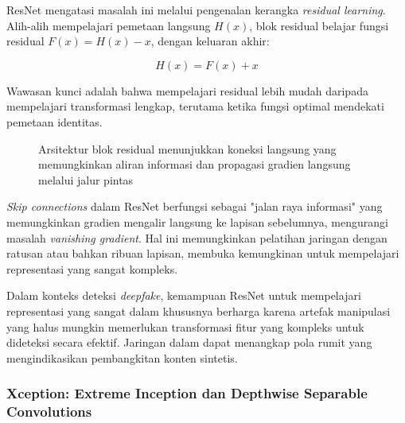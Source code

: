 ResNet mengatasi masalah ini melalui pengenalan kerangka \textit{residual learning}. Alih-alih mempelajari pemetaan langsung $H(x)$, blok residual belajar fungsi residual $F(x) = H(x) - x$, dengan keluaran akhir:

\begin{equation}
H(x) = F(x) + x
\label{eq:residual_output}
\end{equation}

Wawasan kunci adalah bahwa mempelajari residual lebih mudah daripada mempelajari transformasi lengkap, terutama ketika fungsi optimal mendekati pemetaan identitas.

\begin{figure}[H]
    \centering
    \caption{Arsitektur blok residual menunjukkan koneksi langsung yang memungkinkan aliran informasi dan propagasi gradien langsung melalui jalur pintas}
    \label{fig:resnet_block}
\end{figure}

\textit{Skip connections} dalam ResNet berfungsi sebagai "jalan raya informasi" yang memungkinkan gradien mengalir langsung ke lapisan sebelumnya, mengurangi masalah \textit{vanishing gradient}. Hal ini memungkinkan pelatihan jaringan dengan ratusan atau bahkan ribuan lapisan, membuka kemungkinan untuk mempelajari representasi yang sangat kompleks.

Dalam konteks deteksi \textit{deepfake}, kemampuan ResNet untuk mempelajari representasi yang sangat dalam khususnya berharga karena artefak manipulasi yang halus mungkin memerlukan transformasi fitur yang kompleks untuk dideteksi secara efektif. Jaringan dalam dapat menangkap pola rumit yang mengindikasikan pembangkitan konten sintetis.

\subsubsection{Xception: Extreme Inception dan Depthwise Separable Convolutions}

